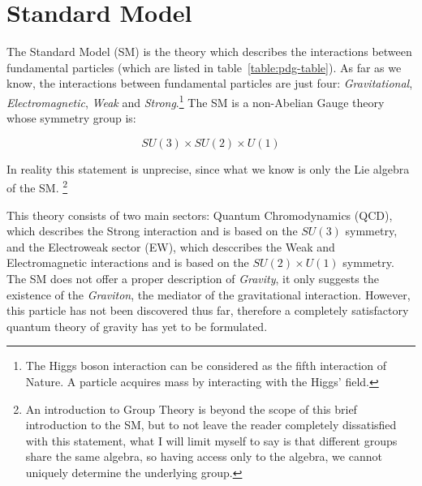 
\chapter{Standard Model}

The Standard Model (SM) is the theory which describes the interactions between fundamental particles 
(which are listed in table~\ref{table:pdg-table}).
As far as we know, the interactions between fundamental particles are just four: \textit{Gravitational}, 
\textit{Electromagnetic}, \textit{Weak} and \textit{Strong}.\footnote[1]{The Higgs boson interaction
can be considered as the fifth interaction of Nature. A particle acquires mass by interacting with the Higgs' 
field.}
The SM is a non-Abelian Gauge theory whose symmetry group is:

\begin{equation}
    SU(3) \times SU(2) \times U(1)
\end{equation}

In reality this statement is unprecise, since what we know is only the Lie algebra of the SM.%
\footnote{
    An introduction to Group Theory is beyond the scope of this brief introduction to the SM, 
    but to not leave the reader completely dissatisfied with this statement, 
    what I will limit myself to say is that different groups share the same algebra, so having access only 
    to the algebra, we cannot uniquely determine the underlying group.}

This theory consists of two main sectors: Quantum Chromodynamics (QCD), which describes the Strong interaction 
and is based on the $SU(3)$ symmetry, and the Electroweak sector (EW), which desccribes the Weak 
and Electromagnetic interactions and is based on the $SU(2) \times U(1)$ symmetry.\\
The SM does not offer a proper description of \textit{Gravity}, it only suggests the existence of 
the \textit{Graviton}, the mediator of the gravitational interaction.
However, this particle has not been discovered thus far, therefore a completely satisfactory quantum 
theory of gravity has yet to be formulated.\\

